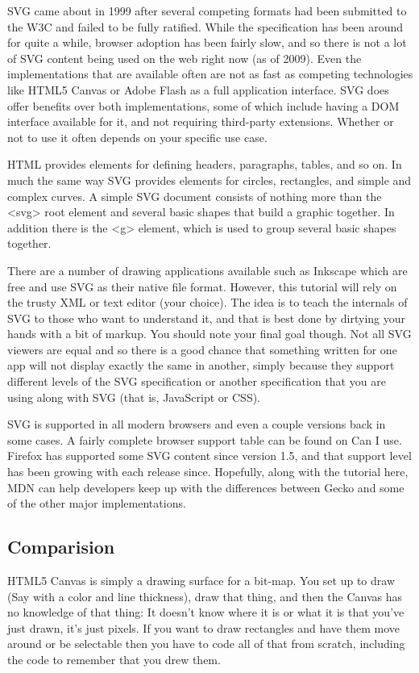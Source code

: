SVG came about in 1999 after several competing formats had been submitted to the W3C and failed to be fully ratified. While the specification has been around for quite a while, browser adoption has been fairly slow, and so there is not a lot of SVG content being used on the web right now (as of 2009). Even the implementations that are available often are not as fast as competing technologies like HTML5 Canvas or Adobe Flash as a full application interface. SVG does offer benefits over both implementations, some of which include having a DOM interface available for it, and not requiring third-party extensions. Whether or not to use it often depends on your specific use case.

HTML provides elements for defining headers, paragraphs, tables, and so on. In much the same way SVG provides elements for circles, rectangles, and simple and complex curves. A simple SVG document consists of nothing more than the <svg> root element and several basic shapes that build a graphic together. In addition there is the <g> element, which is used to group several basic shapes together.

There are a number of drawing applications available such as Inkscape which are free and use SVG as their native file format. However, this tutorial will rely on the trusty XML or text editor (your choice). The idea is to teach the internals of SVG to those who want to understand it, and that is best done by dirtying your hands with a bit of markup. You should note your final goal though. Not all SVG viewers are equal and so there is a good chance that something written for one app will not display exactly the same in another, simply because they support different levels of the SVG specification or another specification that you are using along with SVG (that is, JavaScript or CSS).

SVG is supported in all modern browsers and even a couple versions back in some cases. A fairly complete browser support table can be found on Can I use. Firefox has supported some SVG content since version 1.5, and that support level has been growing with each release since. Hopefully, along with the tutorial here, MDN can help developers keep up with the differences between Gecko and some of the other major implementations.

\subsection{Comparision}
HTML5 Canvas is simply a drawing surface for a bit-map. You set up to draw (Say with a color and line thickness), draw that thing, and then the Canvas has no knowledge of that thing: It doesn't know where it is or what it is that you've just drawn, it's just pixels. If you want to draw rectangles and have them move around or be selectable then you have to code all of that from scratch, including the code to remember that you drew them.

